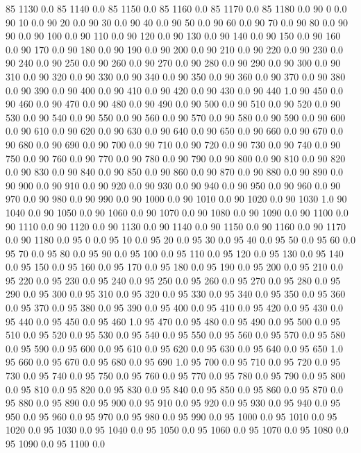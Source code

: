 85	1130	0.0
85	1140	0.0
85	1150	0.0
85	1160	0.0
85	1170	0.0
85	1180	0.0
90	0	0.0
90	10	0.0
90	20	0.0
90	30	0.0
90	40	0.0
90	50	0.0
90	60	0.0
90	70	0.0
90	80	0.0
90	90	0.0
90	100	0.0
90	110	0.0
90	120	0.0
90	130	0.0
90	140	0.0
90	150	0.0
90	160	0.0
90	170	0.0
90	180	0.0
90	190	0.0
90	200	0.0
90	210	0.0
90	220	0.0
90	230	0.0
90	240	0.0
90	250	0.0
90	260	0.0
90	270	0.0
90	280	0.0
90	290	0.0
90	300	0.0
90	310	0.0
90	320	0.0
90	330	0.0
90	340	0.0
90	350	0.0
90	360	0.0
90	370	0.0
90	380	0.0
90	390	0.0
90	400	0.0
90	410	0.0
90	420	0.0
90	430	0.0
90	440	1.0
90	450	0.0
90	460	0.0
90	470	0.0
90	480	0.0
90	490	0.0
90	500	0.0
90	510	0.0
90	520	0.0
90	530	0.0
90	540	0.0
90	550	0.0
90	560	0.0
90	570	0.0
90	580	0.0
90	590	0.0
90	600	0.0
90	610	0.0
90	620	0.0
90	630	0.0
90	640	0.0
90	650	0.0
90	660	0.0
90	670	0.0
90	680	0.0
90	690	0.0
90	700	0.0
90	710	0.0
90	720	0.0
90	730	0.0
90	740	0.0
90	750	0.0
90	760	0.0
90	770	0.0
90	780	0.0
90	790	0.0
90	800	0.0
90	810	0.0
90	820	0.0
90	830	0.0
90	840	0.0
90	850	0.0
90	860	0.0
90	870	0.0
90	880	0.0
90	890	0.0
90	900	0.0
90	910	0.0
90	920	0.0
90	930	0.0
90	940	0.0
90	950	0.0
90	960	0.0
90	970	0.0
90	980	0.0
90	990	0.0
90	1000	0.0
90	1010	0.0
90	1020	0.0
90	1030	1.0
90	1040	0.0
90	1050	0.0
90	1060	0.0
90	1070	0.0
90	1080	0.0
90	1090	0.0
90	1100	0.0
90	1110	0.0
90	1120	0.0
90	1130	0.0
90	1140	0.0
90	1150	0.0
90	1160	0.0
90	1170	0.0
90	1180	0.0
95	0	0.0
95	10	0.0
95	20	0.0
95	30	0.0
95	40	0.0
95	50	0.0
95	60	0.0
95	70	0.0
95	80	0.0
95	90	0.0
95	100	0.0
95	110	0.0
95	120	0.0
95	130	0.0
95	140	0.0
95	150	0.0
95	160	0.0
95	170	0.0
95	180	0.0
95	190	0.0
95	200	0.0
95	210	0.0
95	220	0.0
95	230	0.0
95	240	0.0
95	250	0.0
95	260	0.0
95	270	0.0
95	280	0.0
95	290	0.0
95	300	0.0
95	310	0.0
95	320	0.0
95	330	0.0
95	340	0.0
95	350	0.0
95	360	0.0
95	370	0.0
95	380	0.0
95	390	0.0
95	400	0.0
95	410	0.0
95	420	0.0
95	430	0.0
95	440	0.0
95	450	0.0
95	460	1.0
95	470	0.0
95	480	0.0
95	490	0.0
95	500	0.0
95	510	0.0
95	520	0.0
95	530	0.0
95	540	0.0
95	550	0.0
95	560	0.0
95	570	0.0
95	580	0.0
95	590	0.0
95	600	0.0
95	610	0.0
95	620	0.0
95	630	0.0
95	640	0.0
95	650	1.0
95	660	0.0
95	670	0.0
95	680	0.0
95	690	1.0
95	700	0.0
95	710	0.0
95	720	0.0
95	730	0.0
95	740	0.0
95	750	0.0
95	760	0.0
95	770	0.0
95	780	0.0
95	790	0.0
95	800	0.0
95	810	0.0
95	820	0.0
95	830	0.0
95	840	0.0
95	850	0.0
95	860	0.0
95	870	0.0
95	880	0.0
95	890	0.0
95	900	0.0
95	910	0.0
95	920	0.0
95	930	0.0
95	940	0.0
95	950	0.0
95	960	0.0
95	970	0.0
95	980	0.0
95	990	0.0
95	1000	0.0
95	1010	0.0
95	1020	0.0
95	1030	0.0
95	1040	0.0
95	1050	0.0
95	1060	0.0
95	1070	0.0
95	1080	0.0
95	1090	0.0
95	1100	0.0
